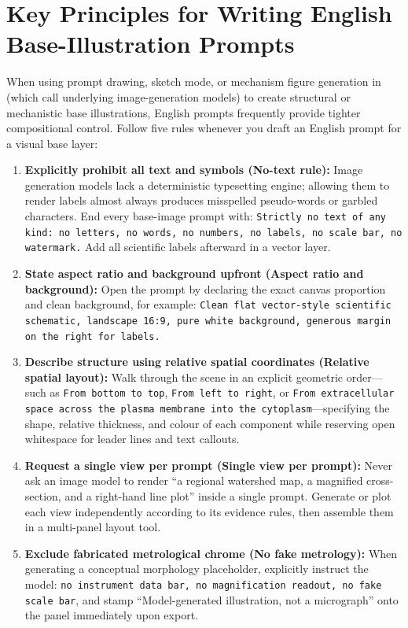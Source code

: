 \section{Key Principles for Writing English Base-Illustration Prompts}

When using prompt drawing, sketch mode, or mechanism figure generation in \scidraw{} (which call underlying image-generation models) to create structural or mechanistic base illustrations, English prompts frequently provide tighter compositional control. Follow five rules whenever you draft an English prompt for a visual base layer:

\begin{enumerate}
  \item \textbf{Explicitly prohibit all text and symbols (No-text rule):} Image generation models lack a deterministic typesetting engine; allowing them to render labels almost always produces misspelled pseudo-words or garbled characters. End every base-image prompt with: \texttt{Strictly no text of any kind: no letters, no words, no numbers, no labels, no scale bar, no watermark.} Add all scientific labels afterward in a vector layer.
  \item \textbf{State aspect ratio and background upfront (Aspect ratio and background):} Open the prompt by declaring the exact canvas proportion and clean background, for example: \texttt{Clean flat vector-style scientific schematic, landscape 16:9, pure white background, generous margin on the right for labels.}
  \item \textbf{Describe structure using relative spatial coordinates (Relative spatial layout):} Walk through the scene in an explicit geometric order---such as \texttt{From bottom to top}, \texttt{From left to right}, or \texttt{From extracellular space across the plasma membrane into the cytoplasm}---specifying the shape, relative thickness, and colour of each component while reserving open whitespace for leader lines and text callouts.
  \item \textbf{Request a single view per prompt (Single view per prompt):} Never ask an image model to render ``a regional watershed map, a magnified cross-section, and a right-hand line plot'' inside a single prompt. Generate or plot each view independently according to its evidence rules, then assemble them in a multi-panel layout tool.
  \item \textbf{Exclude fabricated metrological chrome (No fake metrology):} When generating a conceptual morphology placeholder, explicitly instruct the model: \texttt{no instrument data bar, no magnification readout, no fake scale bar}, and stamp ``Model-generated illustration, not a micrograph'' onto the panel immediately upon export.
\end{enumerate}

